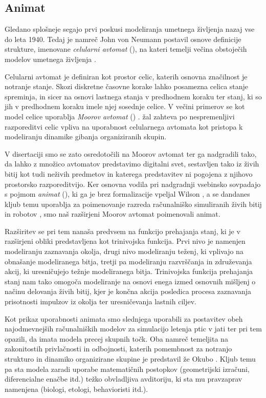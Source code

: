 \begin{razsirjeniPovzetek}
\section{Animat}
Gledano splošneje segajo prvi poskusi modeliranja umetnega življenja nazaj vse do leta 1940. Tedaj je namreč John von Neumann postavil osnove definicije strukture, imenovane \emph{celularni avtomat} (), na kateri temelji večina obstoječih modelov umetnega življenja \cite{adami:1998,bonabeau:1999,emmenche:1994,gardner:1970,langton:1984,rucker:1993}.

Celularni avtomat je definiran kot prostor celic, katerih osnovna značilnost je notranje stanje. Skozi diskretne časovne korake lahko posamezna celica stanje spreminja, in sicer na osnovi lastnega stanja v predhodnem koraku ter stanj, ki so jih v predhodnem koraku imele njej sosednje celice. V večini primerov se kot model celice uporablja \emph{Moorov avtomat} () \cite{mraz:2000}. žal zahteva po nespremenljivi razporeditvi celic vpliva na uporabnost celularnega avtomata kot pristopa k modeliranju dinamike gibanja organiziranih skupin.

V disertaciji smo se zato osredotočili na Moorov avtomat ter ga nadgradili tako, da lahko z množico avtomatov predstavimo digitalni svet, sestavljen tako iz živih bitij kot tudi neživih predmetov in katerega predstavitev ni pogojena z njihovo prostorsko razporeditvijo. Ker osnovna vodila pri nadgradnji vsebinsko sovpadajo s pojmom \emph{animat} (), ki ga je brez formalizacije vpeljal Wilson \cite{wilson:1985}, a se dandanes kljub temu uporablja za poimenovanje razreda računalniško simuliranih živih bitij in robotov \cite{cliff:1993,watts:1998}, smo naš razširjeni Moorov avtomat poimenovali animat.

Razširitev se pri tem nanaša predvsem na funkcijo prehajanja stanj, ki je v razširjeni obliki predstavljena kot trinivojska funkcija. Prvi nivo je namenjen modeliranju zaznavanja okolja, drugi nivo modeliranju teženj, ki vplivajo na obnašanje modeliranega bitja, tretji pa modeliranju razvrščanja in združevanja akcij, ki uresničujejo težnje modeliranega bitja. Trinivojska funkcija prehajanja stanj nam tako omogoča modeliranje na osnovi enega izmed osnovnih mišljenj o načinu delovanja živih bitij, kjer je končna akcija posledica procesa zaznavanja prisotnosti impulzov iz okolja ter uresničevanja lastnih ciljev.

Kot prikaz uporabnosti animata smo slednjega uporabili za postavitev obeh najodmevnejših računalniških modelov za simulacijo letenja ptic v jati ter pri tem opazili, da imata modela precej skupnih točk. Oba namreč temeljita na zakonitostih privlačnosti in odbojnosti, katerih pomembnost za notranjo strukturo in dinamiko organizirane skupine je predstavil že Okubo \cite{okubo:1980}. Kljub temu pa sta modela zaradi uporabe matematičnih postopkov (geometrijski izračuni, diferencialne enačbe itd.) težko obvladljiva avditoriju, ki sta mu pravzaprav namenjena (biologi, etologi, behavioristi itd.).


\end{razsirjeniPovzetek}
